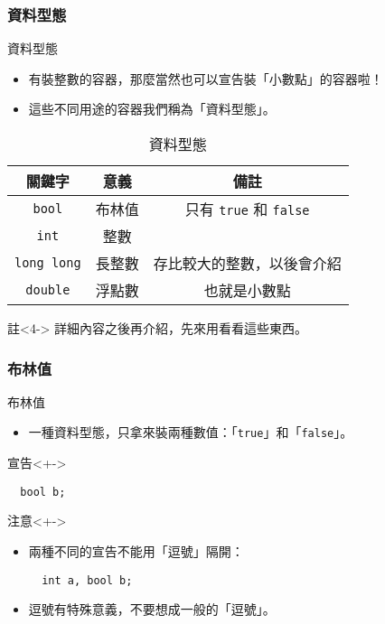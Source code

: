 \documentclass[utf8]{beamer}
\begin{document}
\begin{CJK}{UTF8}{bkai}
\begin{frame}[fragile]
  \frametitle{資料型態}
  \begin{block}{資料型態}
    \begin{itemize}
    \item<1-> 有裝整數的容器，那麼當然也可以宣告裝「小數點」的容器啦！
    \item<2-> 這些不同用途的容器我們稱為「\alert{資料型態}」。
    \end{itemize}
  \end{block}
  \pause\pause
  \begin{table}[h]
    \begin{tabular}{|c|c|c|}
    \hline
    關鍵字                   & 意義 & 備註\\
    \hline
    \lstinline{bool}{}      & 布林值 & 只有 \lstinline{true}{} 和 \lstinline{false}{}\\
    \hline
    \lstinline{int}{}       & 整數 &\\
    \hline
    \lstinline{long long}{} & 長整數 & 存比較大的整數，以後會介紹\\
    \hline
    \lstinline{double}{}    & \alert{浮點數} & 也就是小數點\\
    \hline
    \end{tabular}
    \caption{資料型態}
  \end{table}
  \begin{exampleblock}{註}<4->
  詳細內容之後再介紹，先來用看看這些東西。
  \end{exampleblock}
\end{frame}

\begin{frame}[fragile]
  \frametitle{布林值}
  \begin{exampleblock}{布林值}
    \begin{itemize}[<+->]
    \item 一種資料型態，只拿來裝兩種數值：「\lstinline{true}{}」和「\lstinline{false}{}」。
    \end{itemize}
  \end{exampleblock}
  \begin{alertblock}{宣告}<+->
    \begin{lstlisting}
  bool b;
    \end{lstlisting}
  \end{alertblock}
  \begin{alertblock}{注意}<+->
    \begin{itemize}
    \item 兩種不同的宣告不能用「逗號」隔開：
      \begin{lstlisting}
  int a, bool b;
      \end{lstlisting}
    \item<+-> 逗號有\alert{特殊意義}，不要想成一般的「逗號」。
    \end{itemize}
  \end{alertblock}
\end{frame}


\end{CJK}
\end{document}
